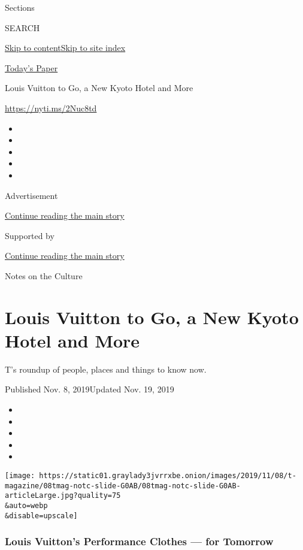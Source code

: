 Sections

SEARCH

\protect\hyperlink{site-content}{Skip to
content}\protect\hyperlink{site-index}{Skip to site index}

\href{https://myaccount.nytimes3xbfgragh.onion/auth/login?response_type=cookie\&client_id=vi}{}

\href{https://www.nytimes3xbfgragh.onion/section/todayspaper}{Today's
Paper}

Louis Vuitton to Go, a New Kyoto Hotel and More

\url{https://nyti.ms/2Nuc8td}

\begin{itemize}
\item
\item
\item
\item
\item
\end{itemize}

Advertisement

\protect\hyperlink{after-top}{Continue reading the main story}

Supported by

\protect\hyperlink{after-sponsor}{Continue reading the main story}

Notes on the Culture

\hypertarget{louis-vuitton-to-go-a-new-kyoto-hotel-and-more}{%
\section{Louis Vuitton to Go, a New Kyoto Hotel and
More}\label{louis-vuitton-to-go-a-new-kyoto-hotel-and-more}}

T's roundup of people, places and things to know now.

Published Nov. 8, 2019Updated Nov. 19, 2019

\begin{itemize}
\item
\item
\item
\item
\item
\end{itemize}

\texttt{[image: https://static01.graylady3jvrrxbe.onion/images/2019/11/08/t-magazine/08tmag-notc-slide-G0AB/08tmag-notc-slide-G0AB-articleLarge.jpg?quality=75\\\&auto=webp\\\&disable=upscale]}

\hypertarget{louis-vuittons-performance-clothes--for-tomorrow}{%
\subsubsection{Louis Vuitton's Performance Clothes --- for
Tomorrow}\label{louis-vuittons-performance-clothes--for-tomorrow}}

